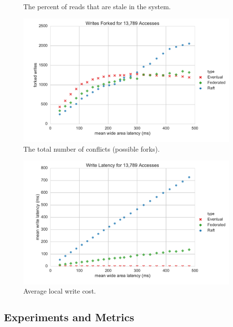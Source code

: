\documentclass[10pt,conference,letterpaper]{IEEEtran}
\begin{document}
\begin{figure}[t]
      \caption{The percent of reads that are stale in the system.}\label{fig:latency_stale_reads}
    \endminipage
      \includegraphics[width=\linewidth]{figures/latency/forked_writes}
      \caption{The total number of conflicts (possible forks).}\label{fig:latency_forked_writes}
    \endminipage\hfill
\end{figure}

\begin{figure}[t]
    \centering
      \includegraphics[width=\linewidth]{figures/latency/write_latency}
      \caption{Average local write cost.}\label{fig:write_latency}
    \endminipage\hfill
\end{figure}

\subsection{Experiments and Metrics}
\end{document}

